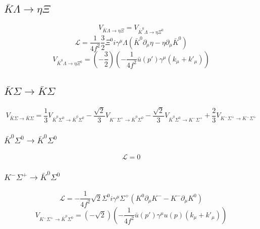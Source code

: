 \subsection{$\bar{K}\Lambda\rightarrow\eta\Xi$}
\begin{equation}
	V_{\bar{K}\Lambda\rightarrow\eta\Xi}=V_{\bar{K}^{0}\Lambda\rightarrow\eta\Xi^{0}}
\end{equation}
\begin{equation}
	\mathcal{L}=\frac{1}{4f^2}\frac{3}{2}\Xi^{0}i\gamma^{\mu}\Lambda(\bar{K}^{0}\partial_{\mu}\eta-\eta\partial_{\mu}\bar{K}^{0})
\end{equation}
\begin{equation}
	V_{\bar{K}^{0}\Lambda\rightarrow\eta\Xi^{0}}=\left(-\frac{3}{2}\right)\left(-\frac{1}{4f^2}\bar{u}(p')\gamma^{\mu}(k_{\mu}+k'_{\mu})\right)
\end{equation}
\subsection{$\bar{K}\Sigma\rightarrow \bar{K}\Sigma$}
\begin{equation}
	V_{\bar{K}\Sigma\rightarrow \bar{K}\Sigma}=\frac{1}{3}V_{\bar{K}^{0}\Sigma^{0}\rightarrow \bar{K}^{0}\Sigma^{0}}-\frac{\sqrt{2}}{3}V_{K^{-}\Sigma^{+}\rightarrow \bar{K}^{0}\Sigma^{0}}-\frac{\sqrt{2}}{3}V_{\bar{K}^{0}\Sigma^{0}\rightarrow K^{-}\Sigma^{+}}+\frac{2}{3}V_{K^{-}\Sigma^{+}\rightarrow K^{-}\Sigma^{+}}
\end{equation}
\subsubsection{$\bar{K}^{0}\Sigma^{0}\rightarrow \bar{K}^{0}\Sigma^{0}$}
\begin{equation}
	\mathcal{L}=0
\end{equation}
\subsubsection{$K^{-}\Sigma^{+}\rightarrow \bar{K}^{0}\Sigma^{0}$}
\begin{equation}
	\mathcal{L}=-\frac{1}{4f^2}\sqrt{2}\Sigma^{0}i\gamma^{\mu}\Sigma^{+}(K^{0}\partial_{\mu}K^{-}-K^{-}\partial_{\mu}K^{0})
\end{equation}
\begin{equation}
	V_{K^{-}\Sigma^{+}\rightarrow \bar{K}^{0}\Sigma^{0}}=\left(-\sqrt{2}\right)\left(-\frac{1}{4f^2}\bar{u}(p')\gamma^{\mu}u(p)(k_{\mu}+k'_{\mu})\right)
\end{equation}
